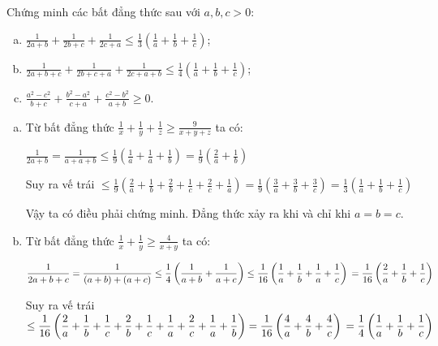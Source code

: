 \begin{problem}
	Chứng minh các bất đẳng thức sau với $a, b, c > 0$:
	\begin{enumerate}[a)]
		\item 
		$\displaystyle \frac{1}{2a + b} + \frac{1}{2b + c} + \frac{1}{2c + a} \le 
		\frac{1}{3}\left(\frac{1}{a} + \frac{1}{b} + \frac{1}{c}\right)$;
		\item
		$\displaystyle \frac{1}{2a + b + c} + \frac{1}{2b + c + a} + \frac{1}{2c + a + b} \le 
		\frac{1}{4}\left(\frac{1}{a} + \frac{1}{b} + \frac{1}{c}\right)$;
		\item 
		$\displaystyle \frac{a^2 - c^2}{b + c} + \frac{b^2 - a^2}{c + a} + \frac{c^2 - b^2}{a + b} \ge 0$.
	\end{enumerate}

	\solution
	\begin{enumerate}[a)]
		\item 
		Từ bất đẳng thức $\displaystyle \frac{1}{x} + \frac{1}{y} + \frac{1}{z} \ge 
		\frac{9}{x + y + z}$ ta có:

		$\displaystyle \frac{1}{2a + b} = \frac{1}{a + a + b} \le \frac{1}{9}\left(\frac{1}{a} + \frac{1}{a} + \frac{1}{b}\right) = \frac{1}{9}\left(\frac{2}{a} + \frac{1}{b}\right)$

		Suy ra vế trái $\displaystyle \le \frac{1}{9}\left(\frac{2}{a} + \frac{1}{b}
		+ \frac{2}{b} + \frac{1}{c} + \frac{2}{c} + \frac{1}{a} \right)	= \frac{1}{9}\left(
		\frac{3}{a} + \frac{3}{b} + \frac{3}{c} \right) = \frac{1}{3}\left(\frac{1}{a} + \frac{1}{b} + \frac{1}{c} \right)$

		Vậy ta có điều phải chứng minh. Đẳng thức xảy ra khi và chỉ khi $a = b = c$.
		\item 
		Từ bất đẳng thức $\displaystyle \frac{1}{x} + \frac{1}{y} \ge \frac{4}{x + y}$ ta có:

		$\displaystyle \frac{1}{2a + b + c} = \frac{1}{(a + b) + (a + c)} \le \frac{1}{4}
		\left(\frac{1}{a + b} + \frac{1}{a + c}\right) \le \frac{1}{16}\left(
		\frac{1}{a} + \frac{1}{b} + \frac{1}{a} + \frac{1}{c}\right) \\ = \frac{1}{16}
		\left(\frac{2}{a} + \frac{1}{b} + \frac{1}{c}\right)$

		Suy ra vế trái $\displaystyle \le \frac{1}{16}\left(\frac{2}{a} + \frac{1}{b} + \frac{1}{c} + \frac{2}{b} + \frac{1}{c} + \frac{1}{a} + \frac{2}{c} + \frac{1}{a} + \frac{1}{b} \right) = \frac{1}{16}\left(\frac{4}{a} + \frac{4}{b} + \frac{4}{c}\right) \\ = 
		\frac{1}{4}\left(\frac{1}{a} + \frac{1}{b} + \frac{1}{c}\right)$


\end{enumerate}
\end{problem}
